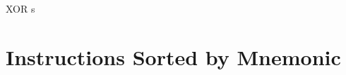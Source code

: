 \documentclass[twoside,openright,a4paper]{book}
\begin{document}
\begin{basedescript}{
	\desclabelstyle{\multilinelabel}
	\desclabelwidth{3cm}}
\begin{detailitem}{XOR s}
		\begin{DetailTiming}
		\end{DetailTiming}

	\end{detailitem}

\end{basedescript}



\appendix


\chapter{Instructions Sorted by Mnemonic}
\end{document}
